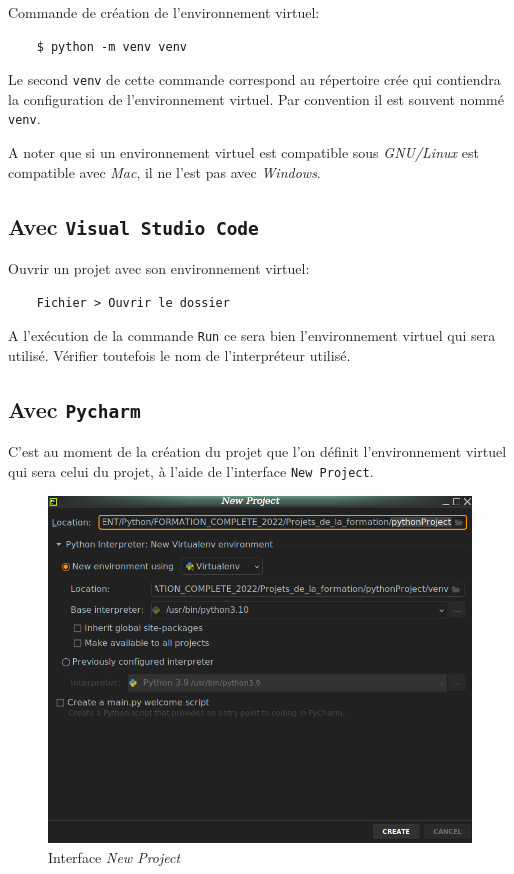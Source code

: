 \documentclass[a4paper,11pt]{book}
\begin{document}
Commande de création de l'environnement virtuel:
\begin{verbatim}
    $ python -m venv venv
\end{verbatim}
\medskip

Le second \texttt{venv} de cette commande correspond au répertoire crée qui contiendra la configuration de l'environnement virtuel. Par convention il est souvent nommé \texttt{venv}.
\medskip

A noter que si un environnement virtuel est compatible sous \textit{GNU/Linux} est compatible avec \textit{Mac}, il ne l'est pas avec \textit{Windows}.
\medskip

\subsection*{Avec \texttt{Visual Studio Code}}
Ouvrir un projet avec son environnement virtuel:
\begin{verbatim}
    Fichier > Ouvrir le dossier
\end{verbatim}
\medskip

A l'exécution de la commande \texttt{Run} ce sera bien l'environnement virtuel qui sera utilisé. Vérifier toutefois le nom de l'interpréteur utilisé.
\medskip

\subsection*{Avec \texttt{Pycharm}}
C'est au moment de la création du projet que l'on définit l'environnement virtuel qui sera celui du projet, à l'aide de l'interface \texttt{New Project}.
\begin{figure}[h]
\begin{center}
\includegraphics[scale=0.4]{IMG/Pycharm-12.png}
\caption{Interface \textit{New Project}}
\end{center}
\end{figure}
\medskip
\end{document}
